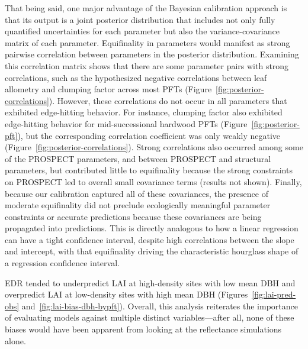 That being said, one major advantage of the Bayesian calibration approach is that its output is a joint posterior distribution that includes not only fully quantified uncertainties for each parameter but also the variance-covariance matrix of each parameter.
Equifinality in parameters would manifest as strong pairwise correlation between parameters in the posterior distribution.
Examining this correlation matrix shows that there are some parameter pairs with strong correlations, such as the hypothesized negative correlations between leaf allometry and clumping factor across most PFTs (Figure~\ref{fig:posterior-correlations}).
However, these correlations do not occur in all parameters that exhibited edge-hitting behavior.
For instance, clumping factor also exhibited edge-hitting behavior for mid-successional hardwood PFTs (Figure~\ref{fig:posterior-pft}), but the corresponding correlation coefficient was only weakly negative (Figure~\ref{fig:posterior-correlations}).
Strong correlations also occurred among some of the PROSPECT parameters, and between PROSPECT and structural parameters, but contributed little to equifinality because the strong constraints on PROSPECT led to overall small covariance terms (results not shown).
Finally, because our calibration captured all of these covariances, the presence of moderate equifinality did not preclude ecologically meaningful parameter constraints or accurate predictions because these covariances are being propagated into predictions.
This is directly analogous to how a linear regression can have a tight confidence interval, despite high correlations between the slope and intercept, with that equifinality driving the characteristic hourglass shape of a regression confidence interval.

EDR tended to underpredict LAI at high-density sites with low mean DBH and overpredict LAI at low-density sites with high mean DBH (Figures~\ref{fig:lai-pred-obs} and~\ref{fig:lai-bias-dbh-bypft}).
Overall, this analysis reiterates the importance of evaluating models against multiple distinct variables---after all, none of these biases would have been apparent from looking at the reflectance simulations alone.

